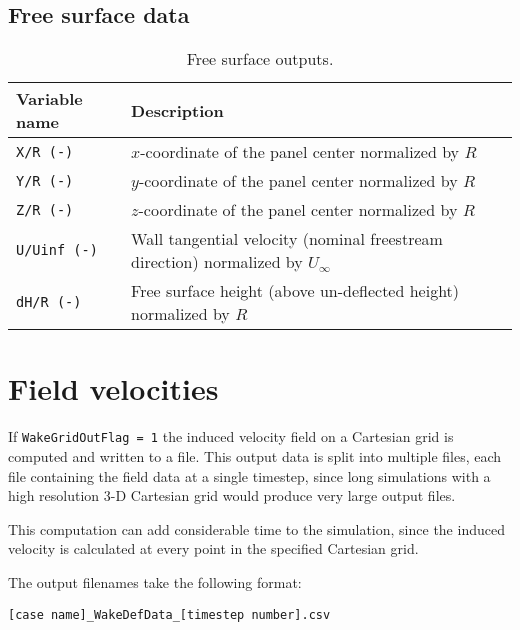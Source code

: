 \subsection{Free surface data}
\begin{table}[!htbp]
\centering
\caption{Free surface outputs.}
\label{tbl:output_free_surface}
\begin{tabular}{p{}p{}}
\toprule
Variable name & Description \\ \midrule
\texttt{X/R (-)}    & $x$-coordinate of the panel center normalized by $R$ \\
\texttt{Y/R (-)}    & $y$-coordinate of the panel center normalized by $R$ \\
\texttt{Z/R (-)}    & $z$-coordinate of the panel center normalized by $R$ \\
\texttt{U/Uinf (-)} & Wall tangential velocity (nominal freestream direction) normalized by $U_\infty$ \\
\texttt{dH/R (-)}   & Free surface height (above un-deflected height) normalized by $R$ \\
\bottomrule
\end{tabular}
\end{table}

\section{Field velocities}
If \texttt{WakeGridOutFlag = 1} the induced velocity field on a Cartesian grid is computed and written to a file. This output data is split into multiple files, each file containing the field data at a single timestep, since long simulations with a high resolution 3-D Cartesian grid would produce very large output files.

This computation can add considerable time to the simulation, since the induced velocity is calculated at every point in the specified Cartesian grid.

The output filenames take the following format:

\begin{lstlisting}
[case name]_WakeDefData_[timestep number].csv
\end{lstlisting}

